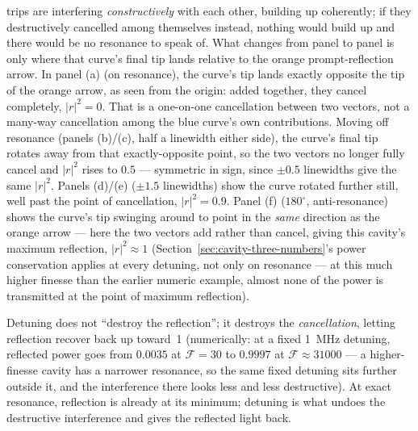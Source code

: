 \documentclass[9pt]{article}
\begin{document}
trips are interfering \emph{constructively} with each other, building up
coherently; if they destructively cancelled among themselves instead,
nothing would build up and there would be no resonance to speak of. What
changes from panel to panel is only where that curve's final tip lands
relative to the orange prompt-reflection arrow. In panel (a) (on resonance),
the curve's tip lands exactly opposite the tip of the orange arrow, as seen
from the origin: added together, they cancel completely, $|r|^2=0$. That is
a one-on-one cancellation between two vectors, not a many-way cancellation
among the blue curve's own contributions. Moving off resonance (panels
(b)/(c), half a linewidth either side), the curve's final tip rotates away
from that exactly-opposite point, so the two vectors no longer fully cancel
and $|r|^2$ rises to $0.5$ --- symmetric in sign, since $\pm0.5$ linewidths
give the same $|r|^2$.
Panels (d)/(e) ($\pm1.5$ linewidths) show the curve
rotated further still, well past the point of cancellation, $|r|^2=0.9$.
Panel (f) ($180^\circ$, anti-resonance) shows the curve's tip swinging
around to point in the \emph{same} direction as the orange arrow --- here
the two vectors add rather than cancel, giving this cavity's maximum
reflection, $|r|^2\approx1$ (Section~\ref{sec:cavity-three-numbers}'s power
conservation applies at every detuning, not only on resonance --- at this
much higher finesse than the earlier numeric example, almost none of the
power is transmitted at the point of maximum reflection).

Detuning does not ``destroy the reflection''; it destroys the
\emph{cancellation}, letting reflection recover back up toward~1 (numerically:
at a fixed \SI{1}{\mega\hertz} detuning, reflected power goes from $0.0035$
at $\mathcal{F}=30$ to $0.9997$ at $\mathcal{F}\approx31000$
--- a higher-finesse
cavity has a narrower resonance, so the same fixed detuning sits further
outside it, and the interference there looks less and less destructive). At
exact resonance, reflection is already at its minimum; detuning is what
undoes the destructive interference and gives the reflected light back.
\end{document}
